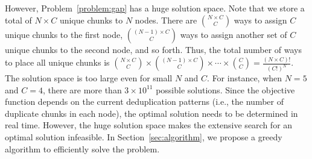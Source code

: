 

However, Problem~\ref{problem:gap} has a huge solution
space.  Note that we store a total of $N\times C$ unique chunks to $N$ nodes.
There are $N\times C \choose C$ ways to assign $C$ unique chunks to the first
node, $(N-1)\times C \choose C$ ways to assign another set of $C$ unique
chunks to
the second node, and so forth.  Thus, the total number of ways to place all
unique chunks is ${N\times C \choose C} \times {(N-1) \times C \choose C} 
\times \cdots \times {C \choose C} = \frac{(N\times C)!}{(C!)^N}$.  The
solution space is too large even for small $N$ and $C$.  For instance, when $N
= 5$ and $C = 4$, there are more than $3 \times 10^{11}$ possible solutions.
Since the objective function depends on the current deduplication patterns
(i.e., the number of duplicate chunks in each node), the optimal solution
needs to be determined in real time.  However, the huge solution space makes
the extensive search for an optimal solution infeasible.  In
Section~\ref{sec:algorithm}, we propose a greedy algorithm to efficiently
solve the problem. 


